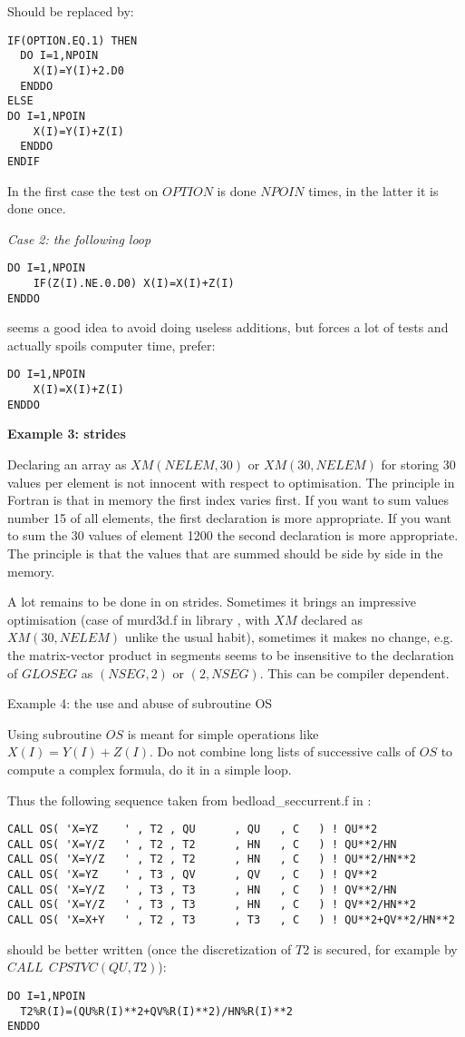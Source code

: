 Should be replaced by:

\begin{lstlisting}
IF(OPTION.EQ.1) THEN
  DO I=1,NPOIN
    X(I)=Y(I)+2.D0
  ENDDO
ELSE
DO I=1,NPOIN
    X(I)=Y(I)+Z(I)
  ENDDO
ENDIF
\end{lstlisting}

In the first case the test on $OPTION$ is done $NPOIN$ times, in the latter it is
done once.

\textit{Case 2: the following loop}
\begin{lstlisting}
DO I=1,NPOIN
    IF(Z(I).NE.0.D0) X(I)=X(I)+Z(I)
ENDDO
\end{lstlisting}
seems a good idea to avoid doing useless additions, but forces a lot of tests
and actually spoils computer time, prefer:
\begin{lstlisting}
DO I=1,NPOIN
    X(I)=X(I)+Z(I)
ENDDO
\end{lstlisting}

\textbf{Example 3: strides}

Declaring an array as $XM(NELEM,30)$ or $XM(30,NELEM)$ for storing 30 values per
element is not innocent with respect to optimisation. The principle in Fortran
is that in memory the first index varies first. If you want to sum values
number 15 of all elements, the first declaration is more appropriate. If you
want to sum the 30 values of element 1200 the second declaration is more
appropriate. The principle is that the values that are summed should be side by
side in the memory.

A lot remains to be done in \telemacsystem on strides. Sometimes it brings an
impressive optimisation (case of murd3d.f in library , with $XM$
declared as $XM(30,NELEM)$ unlike the usual habit), sometimes it makes no change,
e.g. the matrix-vector product in segments seems to be insensitive to the
declaration of $GLOSEG$ as $(NSEG,2)$ or $(2,NSEG)$. This can be compiler dependent.

Example 4: the use and abuse of subroutine OS

Using subroutine $OS$ is meant for simple operations like $X(I)=Y(I)+Z(I)$. Do
not combine long lists of successive calls of $OS$ to compute a complex formula,
do it in a simple loop.

Thus the following sequence taken from bedload\_seccurrent.f in \sisyphe:
\begin{lstlisting}
CALL OS( 'X=YZ    ' , T2 , QU      , QU   , C   ) ! QU**2
CALL OS( 'X=Y/Z   ' , T2 , T2      , HN   , C   ) ! QU**2/HN
CALL OS( 'X=Y/Z   ' , T2 , T2      , HN   , C   ) ! QU**2/HN**2
CALL OS( 'X=YZ    ' , T3 , QV      , QV   , C   ) ! QV**2
CALL OS( 'X=Y/Z   ' , T3 , T3      , HN   , C   ) ! QV**2/HN
CALL OS( 'X=Y/Z   ' , T3 , T3      , HN   , C   ) ! QV**2/HN**2
CALL OS( 'X=X+Y   ' , T2 , T3      , T3   , C   ) ! QU**2+QV**2/HN**2
\end{lstlisting}
should be better written (once the discretization of $T2$ is secured, for example
by $CALL~~CPSTVC(QU, T2)$):
\begin{lstlisting}
DO I=1,NPOIN
  T2%R(I)=(QU%R(I)**2+QV%R(I)**2)/HN%R(I)**2
ENDDO
\end{lstlisting}

